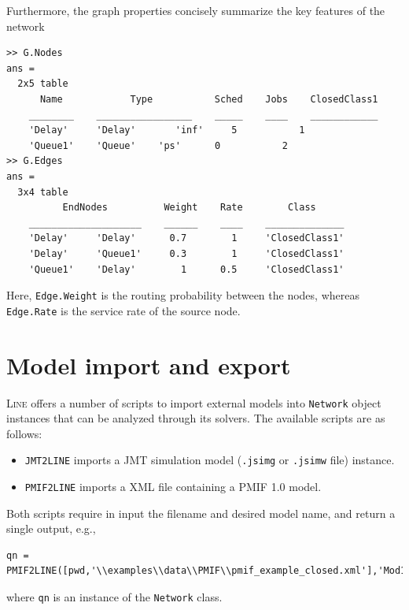 Furthermore, the graph properties concisely summarize the key features of the network
\begin{lstlisting}
>> G.Nodes
ans =
  2x5 table
      Name            Type           Sched    Jobs    ClosedClass1
    ________    _________________    _____    ____    ____________
    'Delay'     'Delay'       'inf'     5           1
    'Queue1'    'Queue'    'ps'      0           2
>> G.Edges
ans =
  3x4 table
          EndNodes          Weight    Rate        Class
    ____________________    ______    ____    ______________
    'Delay'     'Delay'      0.7        1     'ClosedClass1'
    'Delay'     'Queue1'     0.3        1     'ClosedClass1'
    'Queue1'    'Delay'        1      0.5     'ClosedClass1'
\end{lstlisting}
Here, \texttt{Edge.Weight} is the routing probability between the nodes, whereas \texttt{Edge.Rate} is the service rate of the source node.

\section{Model import and export}
\textsc{Line} offers a number of scripts to import external models into \texttt{Network} object instances that can be analyzed through its solvers. %
The available scripts are as follows:
\begin{itemize}
\item \texttt{JMT2LINE} imports a JMT simulation model (\texttt{.jsimg} or \texttt{.jsimw} file) instance.
\item \texttt{PMIF2LINE} imports a XML file containing a PMIF 1.0 model.
\end{itemize}
Both scripts require in input the filename and desired model name, and return a single output, e.g.,
\begin{lstlisting}
qn = PMIF2LINE([pwd,'\\examples\\data\\PMIF\\pmif_example_closed.xml'],'Mod1')
\end{lstlisting}
where \texttt{qn} is an instance of the \texttt{Network} class.

